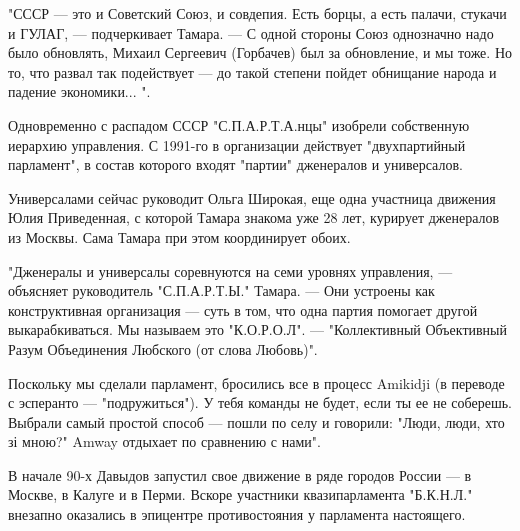 "СССР --- это и Советский Союз, и совдепия. Есть борцы, а есть палачи, стукачи и
ГУЛАГ, --- подчеркивает Тамара. --- С одной стороны Союз однозначно надо было
обновлять, Михаил Сергеевич (Горбачев) был за обновление, и мы тоже. Но то, что
развал так подействует --- до такой степени пойдет обнищание народа и падение
экономики... ".

Одновременно с распадом СССР "С.П.А.Р.Т.А.нцы" изобрели собственную иерархию
управления. С 1991-го в организации действует "двухпартийный парламент", в
состав которого входят "партии" дженералов и универсалов. 

Универсалами сейчас руководит Ольга Широкая, еще одна участница движения Юлия
Приведенная, с которой Тамара знакома уже 28 лет, курирует дженералов из
Москвы. Сама Тамара при этом координирует обоих.

"Дженералы и универсалы соревнуются на семи уровнях управления, --- объясняет
руководитель "С.П.А.Р.Т.Ы." Тамара. --- Они устроены как конструктивная
организация --- суть в том, что одна партия помогает другой выкарабкиваться. Мы
называем это "К.О.Р.О.Л". --- "Коллективный Объективный Разум Объединения
Любского (от слова Любовь)". 

Поскольку мы сделали парламент, бросились все в процесс Amikidji (в переводе с
эсперанто --- "подружиться"). У тебя команды не будет, если ты ее не соберешь.
Выбрали самый простой способ --- пошли по селу и говорили: "Люди, люди, хто зі
мною?" Amway отдыхает по сравнению с нами".

В начале 90-х Давыдов запустил свое движение в ряде городов России --- в Москве,
в Калуге и в Перми. Вскоре участники квазипарламента "Б.К.Н.Л." внезапно
оказались в эпицентре противостояния у парламента настоящего.


